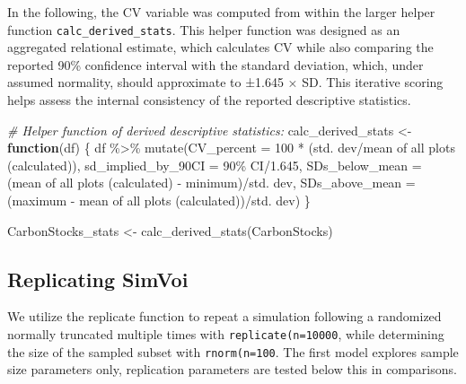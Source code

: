 \documentclass[
]{article}
\newenvironment{Shaded}{}{}
\newcommand{\AttributeTok}[1]{\textcolor[rgb]{0.49,0.56,0.16}{#1}}
\newcommand{\CommentTok}[1]{\textcolor[rgb]{0.38,0.63,0.69}{\textit{#1}}}
\newcommand{\ControlFlowTok}[1]{\textcolor[rgb]{0.00,0.44,0.13}{\textbf{#1}}}
\newcommand{\DecValTok}[1]{\textcolor[rgb]{0.25,0.63,0.44}{#1}}
\newcommand{\FloatTok}[1]{\textcolor[rgb]{0.25,0.63,0.44}{#1}}
\newcommand{\FunctionTok}[1]{\textcolor[rgb]{0.02,0.16,0.49}{#1}}
\newcommand{\NormalTok}[1]{#1}
\newcommand{\OtherTok}[1]{\textcolor[rgb]{0.00,0.44,0.13}{#1}}
\newcommand{\SpecialCharTok}[1]{\textcolor[rgb]{0.25,0.44,0.63}{#1}}
\newcommand{\StringTok}[1]{\textcolor[rgb]{0.25,0.44,0.63}{#1}}
\begin{document}
In the following, the CV variable was computed from within the larger
helper function \texttt{calc\_derived\_stats}. This helper function was
designed as an aggregated relational estimate, which calculates CV while
also comparing the reported 90\% confidence interval with the standard
deviation, which, under assumed normality, should approximate to ±1.645
× SD. This iterative scoring helps assess the internal consistency of
the reported descriptive statistics.

\begin{Shaded}
\begin{Highlighting}[numbers=left,,]
\CommentTok{\# Helper function of derived descriptive statistics:}
\NormalTok{calc\_derived\_stats }\OtherTok{\textless{}{-}} \ControlFlowTok{function}\NormalTok{(df) \{}
\NormalTok{    df }\SpecialCharTok{\%\textgreater{}\%}
        \FunctionTok{mutate}\NormalTok{(}\AttributeTok{CV\_percent =} \DecValTok{100} \SpecialCharTok{*}\NormalTok{ (}\StringTok{\textasciigrave{}}\AttributeTok{std. dev}\StringTok{\textasciigrave{}}\SpecialCharTok{/}\StringTok{\textasciigrave{}}\AttributeTok{mean of all plots (calculated)}\StringTok{\textasciigrave{}}\NormalTok{),}
            \AttributeTok{sd\_implied\_by\_90CI =} \StringTok{\textasciigrave{}}\AttributeTok{90\% CI}\StringTok{\textasciigrave{}}\SpecialCharTok{/}\FloatTok{1.645}\NormalTok{, }\AttributeTok{SDs\_below\_mean =}\NormalTok{ (}\StringTok{\textasciigrave{}}\AttributeTok{mean of all plots (calculated)}\StringTok{\textasciigrave{}} \SpecialCharTok{{-}}
\NormalTok{                minimum)}\SpecialCharTok{/}\StringTok{\textasciigrave{}}\AttributeTok{std. dev}\StringTok{\textasciigrave{}}\NormalTok{, }\AttributeTok{SDs\_above\_mean =}\NormalTok{ (maximum }\SpecialCharTok{{-}} \StringTok{\textasciigrave{}}\AttributeTok{mean of all plots (calculated)}\StringTok{\textasciigrave{}}\NormalTok{)}\SpecialCharTok{/}\StringTok{\textasciigrave{}}\AttributeTok{std. dev}\StringTok{\textasciigrave{}}\NormalTok{)}
\NormalTok{\}}

\NormalTok{CarbonStocks\_stats }\OtherTok{\textless{}{-}} \FunctionTok{calc\_derived\_stats}\NormalTok{(CarbonStocks)}
\end{Highlighting}
\end{Shaded}

\subsection{Replicating SimVoi}\label{replicating-simvoi}

We utilize the replicate function to repeat a simulation following a
randomized normally truncated multiple times with
\texttt{replicate(n=10000}, while determining the size of the sampled
subset with \texttt{rnorm(n=100}. The first model explores sample size
parameters only, replication parameters are tested below this in
comparisons.
\end{document}
